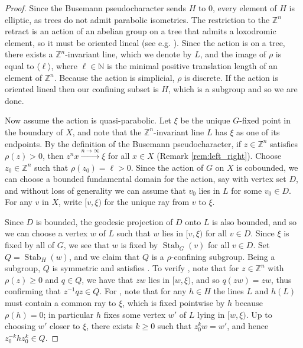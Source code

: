 \documentclass[reqno,12pt]{amsart}\setcounter{tocdepth}{1}
\theoremstyle{definition}
\newcommand{\N}{\mathbb{N}}
\newcommand{\Z}{\mathbb{Z}}
\DeclareMathOperator{\Stab}{Stab}
\numberwithin{equation}{section}
\begin{document}
\begin{proof}
Since the Busemann pseudocharacter sends $H$ to $0$, every element of $H$ is elliptic, as trees do not admit parabolic isometries. The restriction to the $\Z^n$ retract is an action of an abelian group on a tree that admits a loxodromic element, so it must be oriented lineal (see e.g. \cite[Proposition 3.2]{NL}). Since the action is on a tree, there exists a $\Z^n$-invariant line, which we denote by $L$, and the image of $\rho$ is equal to $\langle \ell \rangle$, where $\ell \in \N$ is the minimal positive translation length of an element of $\Z^n$. Because the action is simplicial, $\rho$ is discrete. 
If the action is oriented lineal then our confining subset is $H$, which is a subgroup and so we are done.

Now assume the action is quasi-parabolic. Let $\xi$ be the unique $G$-fixed point in the boundary of $X$, and note that the $\Z^n$-invariant line $L$ has $\xi$ as one of its endpoints. By the definition of the Busemann pseudocharacter, if $z \in \Z^n$ satisfies $\rho(z) > 0$, then $z^n x \xrightarrow{n \to \infty} \xi$ for all $x \in X$ (Remark \ref{rem:left_right}). Choose $z_0\in\Z^n$ such that $\rho(z_0) = \ell > 0$. Since the action of $G$ on $X$ is cobounded, we can choose a bounded fundamental domain for the action, say with vertex set $D$, and without loss of generality we can assume that $v_0$ lies in $L$ for some $v_0\in D$. For any $v$ in $X$, write $[v,\xi)$ for the unique ray from $v$ to $\xi$.

Since $D$ is bounded, the geodesic projection of $D$ onto $L$ is also bounded, and so we can choose a vertex $w$ of $L$ such that $w$ lies in $[v,\xi)$ for all $v\in D$. Since $\xi$ is fixed by all of $G$, we see that $w$ is fixed by $\Stab_G(v)$ for all $v\in D$. Set $Q=\Stab_H(w)$, and we claim that $Q$ is a $\rho$-confining subgroup. Being a subgroup, $Q$ is symmetric and satisfies \ProdConf. To verify \StayInConf, note that for $z\in \Z^n$ with $\rho(z)\ge 0$ and $q\in Q$, we have that $zw$ lies in $[w,\xi)$, and so $q(zw)=zw$, thus confirming that $z^{-1}qz\in Q$. For \GetInConf, note that for any $h\in H$ the lines $L$ and $h(L)$ must contain a common ray to $\xi$, which is fixed pointwise by $h$ because $\rho(h) = 0$; in particular $h$ fixes some vertex $w'$ of $L$ lying in $[w,\xi)$. Up to choosing $w'$ closer to $\xi$, there exists $k \geq 0$ such that $z_0^k w = w'$, and hence $z_0^{-k}hz_0^k\in Q$.


\end{proof}
\end{document}

